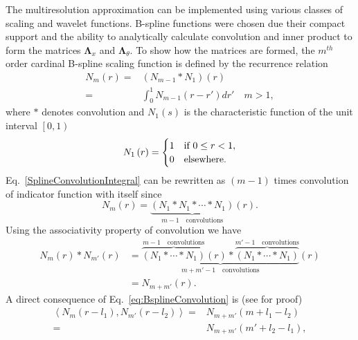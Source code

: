 \documentclass[journal,a4paper]{IEEEtran}
\begin{document}
The multiresolution approximation can be implemented using various classes of scaling and wavelet functions. B-spline functions were chosen due their compact support and the ability to analytically calculate convolution and inner product to form the matrices $ \boldsymbol\Lambda_x$ and $\boldsymbol \Lambda_{\theta}$. To show how the matrices are formed, the $m^{th}$ order cardinal B-spline scaling function is defined by the recurrence relation \cite{Chui1992} 
\begin{align}
N_{m}\left(r\right)=&\left(N_{m-1}\ast N_{1}\right)\left(r\right)\nonumber \\
=&\int_0^{1} N_{m-1}\left( r-r'\right)dr' \quad m>1,
\label{SplineConvolutionIntegral}
\end{align}
where $\ast$ denotes convolution and $N_1\left(s\right)$ is the characteristic function of the unit interval $\left[ 0,1\right)$
\begin{equation}
N_{1}\left(r\right)=
\begin{cases}
1 & \text{if $ 0\le r<1$}, \\
0 & \mathrm{elsewhere}.
\end{cases}
\end{equation}
Eq.~\ref{SplineConvolutionIntegral} can be rewritten as $(m-1)$ times convolution of indicator function with itself since
\begin{equation}
 N_{m}\left(r\right)=\underbrace{\left(N_{1}\ast N_{1}\ast \cdots \ast N_{1}\right)}_{m-1\quad \text{convolutions}}\left(r\right).
\end{equation}
Using the associativity property of convolution we have
\setlength{\arraycolsep}{0.0em}
\begin{align}\label{eq:BsplineConvolution}
N_{m}\left( r\right) \ast N_{m'}\left(r\right)&=\underbrace{\overbrace{\left(N_{1} \ast \cdots \ast N_{1}\right)}^{m-1 \quad \text{convolutions}}\left(r\right) \ast \overbrace{\left(N_{1} \ast \cdots \ast N_{1}\right)}^{m'-1\quad \text{convolutions}}}_{m+m'-1 \quad \text{convolutions}}\left(r\right)\nonumber\\
&=N_{m+m'}\left(r\right).
\end{align}
A direct consequence of Eq.~\eqref{eq:BsplineConvolution} is (see \cite{Chui1992} for proof) 
\begin{align}
 \left\langle N_{m}\left(r-l_{1}\right), N_{m'}\left(r-l_{2}\right)\right\rangle=&N_{m+m'}\left(m+l_{1}-l_{2}\right)\nonumber \\
=&N_{m+m'}\left(m'+l_{2}-l_{1}\right),
\label{eq:BsplineInnerProduct}
\end{align}
\end{document}
